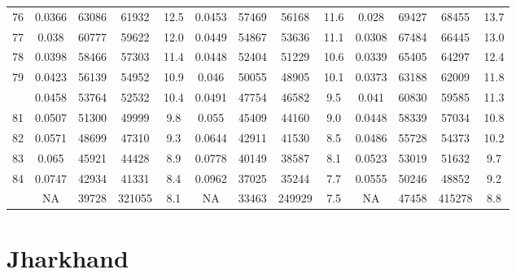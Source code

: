 \documentclass[
  14pt,
]{article}
\begin{document}
\begin{longtable}[t]{lcccccccccccc}
76 & 0.0366 & 63086 & 61932 & 12.5 & 0.0453 & 57469 & 56168 & 11.6 & 0.028 & 69427 & 68455 & 13.7\\
77 & 0.038 & 60777 & 59622 & 12.0 & 0.0449 & 54867 & 53636 & 11.1 & 0.0308 & 67484 & 66445 & 13.0\\
78 & 0.0398 & 58466 & 57303 & 11.4 & 0.0448 & 52404 & 51229 & 10.6 & 0.0339 & 65405 & 64297 & 12.4\\
79 & 0.0423 & 56139 & 54952 & 10.9 & 0.046 & 50055 & 48905 & 10.1 & 0.0373 & 63188 & 62009 & 11.8\\
\addlinespace
80 & 0.0458 & 53764 & 52532 & 10.4 & 0.0491 & 47754 & 46582 & 9.5 & 0.041 & 60830 & 59585 & 11.3\\
81 & 0.0507 & 51300 & 49999 & 9.8 & 0.055 & 45409 & 44160 & 9.0 & 0.0448 & 58339 & 57034 & 10.8\\
82 & 0.0571 & 48699 & 47310 & 9.3 & 0.0644 & 42911 & 41530 & 8.5 & 0.0486 & 55728 & 54373 & 10.2\\
83 & 0.065 & 45921 & 44428 & 8.9 & 0.0778 & 40149 & 38587 & 8.1 & 0.0523 & 53019 & 51632 & 9.7\\
84 & 0.0747 & 42934 & 41331 & 8.4 & 0.0962 & 37025 & 35244 & 7.7 & 0.0555 & 50246 & 48852 & 9.2\\
\addlinespace
85 & NA & 39728 & 321055 & 8.1 & NA & 33463 & 249929 & 7.5 & NA & 47458 & 415278 & 8.8\\*
\end{longtable}

\pagebreak

\hypertarget{jharkhand}{%
\section{Jharkhand}\label{jharkhand}}
\end{document}
